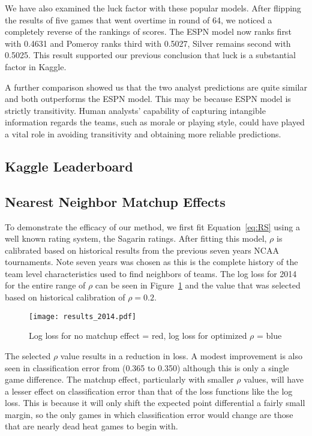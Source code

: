 We have also examined the luck factor with these popular models. After flipping the results of five games that went overtime in round of 64, we noticed a completely reverse of the rankings of scores. The ESPN model now ranks first with 0.4631 and Pomeroy ranks third with 0.5027, Silver remains second with 0.5025. This result supported our previous conclusion that luck is a substantial factor in Kaggle. 

A further comparison showed us that the two analyst predictions are quite similar and both outperforms the ESPN model. This may be because ESPN model is strictly transitivity. Human analysts' capability of capturing intangible information regards the teams, such as  morale or playing style, could have played a vital role in avoiding transitivity and obtaining more reliable predictions. 

\subsection{Kaggle Leaderboard}
\subsection{Nearest Neighbor Matchup Effects}
To demonstrate the efficacy of our method, we first fit Equation~\ref{eq:RS} using a well known rating system, the Sagarin ratings. After fitting this model, $\rho$ is calibrated based on historical results from the previous seven years NCAA tournaments. Note seven years was chosen as this is the complete history of the team level characteristics used to find neighbors of teams. The log loss for 2014 for the entire range of $\rho$ can be seen in Figure~\ref{fig:result} and the value that was selected based on historical calibration of $\rho =0.2$.
\begin{figure}[h!]
\centering
\texttt{[image: results\_2014.pdf]}
\caption{Log loss for no matchup effect = red, log loss for optimized $\rho$ = blue}
\label{fig:result}
\end{figure} 
The selected $\rho$ value results in a reduction in loss. A modest improvement is also seen in classification error from (0.365 to 0.350) although this is only a single game difference. The matchup effect, particularly with smaller $\rho$ values, will have a lesser effect on classification error than that of the loss functions like the log loss. This is because it will only shift the expected point differential a fairly small margin, so the only games in which classification error would change are those that are nearly dead heat games to begin with.

